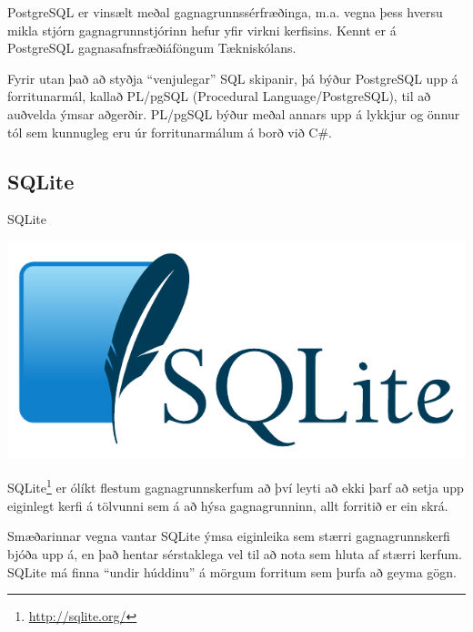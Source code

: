 PostgreSQL er vinsælt meðal gagnagrunnssérfræðinga, m.a. vegna þess hversu mikla stjórn gagnagrunnstjórinn hefur yfir virkni kerfisins. Kennt er á PostgreSQL gagnasafnsfræðiáföngum Tækniskólans.

Fyrir utan það að styðja ``venjulegar'' SQL skipanir, þá býður PostgreSQL upp á forritunarmál, kallað PL/pgSQL (Procedural Language/PostgreSQL), til að auðvelda ýmsar aðgerðir. PL/pgSQL býður meðal annars upp á lykkjur og önnur tól sem kunnugleg eru úr forritunarmálum á borð við C\#.

\newpage
\subsection{SQLite}
\begin{marginfigure}
\caption{SQLite}
\label{mynd:sqlite}
\centering
\includegraphics[width=\linewidth]{myndir/sqlite}
\end{marginfigure}
SQLite\footnote{\url{http://sqlite.org/}} er ólíkt flestum gagnagrunnskerfum að því leyti að ekki þarf að setja upp eiginlegt kerfi á tölvunni sem á að hýsa gagnagrunninn, allt forritið er ein skrá.

Smæðarinnar vegna vantar SQLite ýmsa eiginleika sem stærri gagnagrunnskerfi bjóða upp á, en það hentar sérstaklega vel til að nota sem hluta af stærri kerfum. SQLite má finna ``undir húddinu'' á mörgum forritum sem þurfa að geyma gögn.
